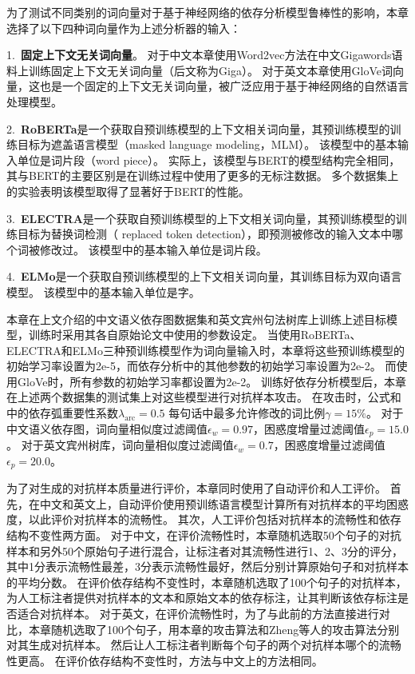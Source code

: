 为了测试不同类别的词向量对于基于神经网络的依存分析模型鲁棒性的影响，本章选择了以下四种词向量作为上述分析器的输入：

1.\ \textbf{固定上下文无关词向量}。
对于中文本章使用Word2vec方法\cite{mikolov-etal-2013-distributed}在中文Gigawords语料上训练固定上下文无关词向量（后文称为Giga）。
对于英文本章使用GloVe词向量\cite{pennington-etal-2014-glove}，这也是一个固定的上下文无关词向量，被广泛应用于基于神经网络的自然语言处理模型。

2.\ \textbf{RoBERTa}\cite{liu-etal-2019-roberta}是一个获取自预训练模型的上下文相关词向量，其预训练模型的训练目标为遮盖语言模型（masked language modeling，MLM）。
该模型中的基本输入单位是词片段（word piece）。
实际上，该模型与BERT的模型结构完全相同，其与BERT的主要区别是在训练过程中使用了更多的无标注数据。
多个数据集上的实验表明该模型取得了显著好于BERT的性能。

3.\ \textbf{ELECTRA}\cite{clark-etal-2020-electra}是一个获取自预训练模型的上下文相关词向量，其预训练模型的训练目标为替换词检测（ replaced token detection），即预测被修改的输入文本中哪个词被修改过。
该模型中的基本输入单位是词片段。

4.\ \textbf{ELMo}\cite{peters-etal-2018-deep}是一个获取自预训练模型的上下文相关词向量，其训练目标为双向语言模型。
该模型中的基本输入单位是字。

本章在上文介绍的中文语义依存图数据集和英文宾州句法树库上训练上述目标模型，训练时采用其各自原始论文中使用的参数设定。
当使用RoBERTa、ELECTRA和ELMo三种预训练模型作为词向量输入时，本章将这些预训练模型的初始学习率设置为2e-5，而依存分析中的其他参数的初始学习率设置为2e-2。
而使用GloVe时，所有参数的初始学习率都设置为2e-2。
训练好依存分析模型后，本章在上述两个数据集的测试集上对这些模型进行对抗样本攻击。
在攻击时，公式\label{eq:word-importance}和\label{eq:mis-inc}中的依存弧重要性系数$\lambda_{\text{arc}}=0.5$ 每句话中最多允许修改的词比例$\gamma=15\%$。
对于中文语义依存图，词向量相似度过滤阈值$\epsilon_w = 0.97$，困惑度增量过滤阈值$\epsilon_p = 15.0$。
对于英文宾州树库，词向量相似度过滤阈值$\epsilon_w = 0.7$，困惑度增量过滤阈值$\epsilon_p = 20.0$。

为了对生成的对抗样本质量进行评价，本章同时使用了自动评价和人工评价。
首先，在中文和英文上，自动评价使用预训练语言模型计算所有对抗样本的平均困惑度，以此评价对抗样本的流畅性。
其次，人工评价包括对抗样本的流畅性和依存结构不变性两方面。
对于中文，在评价流畅性时，本章随机选取50个句子的对抗样本和另外50个原始句子进行混合，让标注者对其流畅性进行1、2、3分的评分，其中1分表示流畅性最差，3分表示流畅性最好，然后分别计算原始句子和对抗样本的平均分数。
在评价依存结构不变性时，本章随机选取了100个句子的对抗样本，为人工标注者提供对抗样本的文本和原始文本的依存标注，让其判断该依存标注是否适合对抗样本。
对于英文，在评价流畅性时，为了与此前的方法直接进行对比，本章随机选取了100个句子，用本章的攻击算法和Zheng等人\cite{zheng-etal-2020-evaluating}的攻击算法分别对其生成对抗样本。
然后让人工标注者判断每个句子的两个对抗样本哪个的流畅性更高。
在评价依存结构不变性时，方法与中文上的方法相同。

